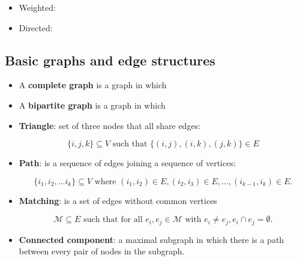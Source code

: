 \documentclass[11  pt]{exam}
\begin{document}
	\begin{itemize}
		\item Weighted: %
		
		\vs{3cm}
		
		\item Directed: %
		
	\end{itemize}
	
	\vs{3cm}
	
	\subsection{Basic graphs and edge structures}
	
	\begin{itemize}
		\item A \textbf{complete graph} is a graph in which \\
		
		\vspace{2cm}
		
		\item A \textbf{bipartite graph} is a graph in which \\
		
		\vspace{2cm}
		
		\item \textbf{Triangle}: set of three nodes that all share edges: 
		
		\begin{equation*}
			\{i,j,k\} \subseteq V \text{ such that }  \{ (i,j), (i,k),  (j,k)\} \in E
		\end{equation*}
		\vspace{2cm}
		
		\item \textbf{Path}: is a sequence of edges joining a sequence of vertices:
		
		\begin{equation*}
			\{i_1, i_2, \hdots i_k\}\subseteq V \text{ where } (i_1, i_2) \in E,  (i_2, i_3) \in E, \hdots , (i_{k-1}, i_k) \in E.
		\end{equation*}
		\vspace{2cm}
		
		\item \textbf{Matching}: is a set of edges without common vertices
		
		\begin{equation*}
			\mathcal{M} \subseteq E \text{ such that for all } e_i, e_j \in \mathcal{M} \text{ with } e_i \neq e_j, e_i \cap e_j = \emptyset.
		\end{equation*}
		\vspace{4cm}
		
		\item \textbf{Connected component}: a maximal subgraph in which there is a path between every pair of nodes in the subgraph.
		\vspace{2cm}
		
	\end{itemize}
	\newpage
	
\end{document}
